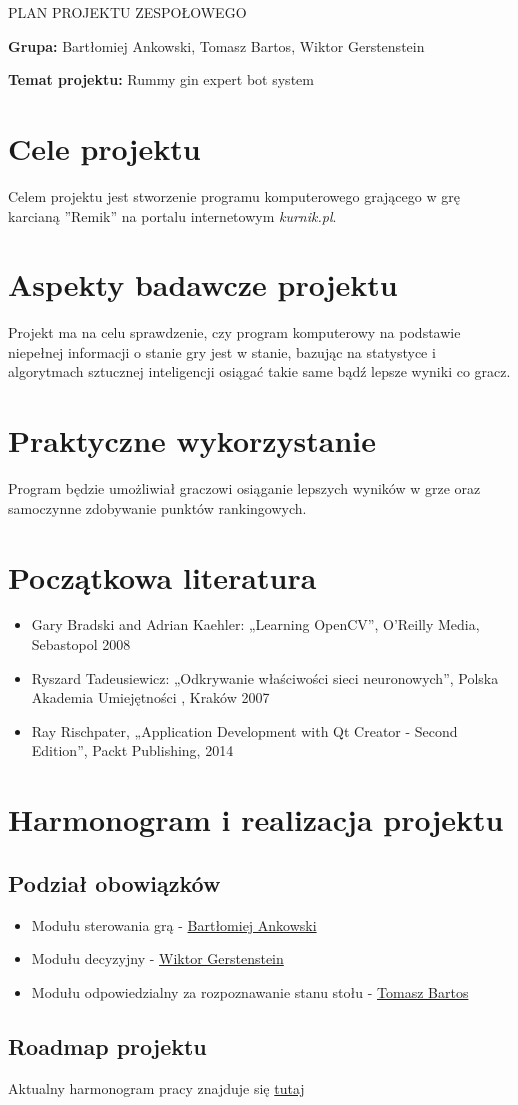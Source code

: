 \documentclass[11pt]{article}
\begin{document}
\title{}
\begin{center}
\Large{PLAN PROJEKTU ZESPOŁOWEGO}
\end{center} 

\textbf{Grupa:} Bartłomiej Ankowski, Tomasz Bartos, Wiktor Gerstenstein

\textbf{Temat projektu:} Rummy gin expert bot system

\section{Cele projektu}
Celem projektu jest stworzenie programu komputerowego grającego w grę karcianą ''Remik'' na portalu internetowym \textit{kurnik.pl}.

\section{Aspekty badawcze projektu}
Projekt ma na celu sprawdzenie, czy program komputerowy na podstawie niepełnej informacji o stanie gry  jest w stanie, bazując na statystyce i algorytmach sztucznej inteligencji osiągać takie same bądź lepsze wyniki co gracz.

\section{Praktyczne wykorzystanie}
Program będzie umożliwiał graczowi osiąganie lepszych wyników w grze oraz samoczynne zdobywanie punktów rankingowych.

\section{Początkowa literatura}
\begin{itemize}
\item Gary Bradski and Adrian Kaehler: „Learning OpenCV”, O’Reilly Media, Sebastopol 2008
\item Ryszard Tadeusiewicz: „Odkrywanie właściwości sieci neuronowych”, Polska Akademia Umiejętności , Kraków 2007
\item Ray Rischpater, „Application Development with Qt Creator - Second Edition”, Packt Publishing, 2014
\end{itemize}

\section{Harmonogram i realizacja projektu}

\subsection{Podział obowiązków}
\begin{itemize}
\item Modułu sterowania grą - \underline{Bartłomiej Ankowski}
\item Modułu decyzyjny - \underline{Wiktor Gerstenstein}
\item Modułu odpowiedzialny za rozpoznawanie stanu stołu - \underline{Tomasz Bartos}
\end{itemize}

\subsection{Roadmap projektu}
Aktualny harmonogram pracy znajduje się \href{https://trello.com/b/PmTsc0OK/team-project-art-roadmap}{tutaj}
\end{document}
